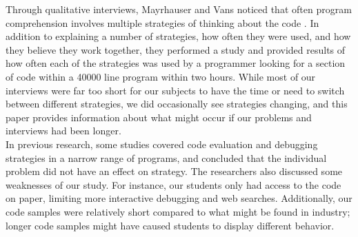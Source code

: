 Through qualitative interviews, Mayrhauser and Vans noticed that often program comprehension involves multiple strategies of thinking about the code \cite{402076}.
In addition to explaining a number of strategies, how often they were used, and how they believe they work together, they performed a study and provided results of how often each of the strategies was used by a programmer looking for a section of code within a 40000 line program within two hours.
While most of our interviews were far too short for our subjects to have the time or need to switch between different strategies, we did occasionally see strategies changing, and this paper provides information about what might occur if our problems and interviews had been longer. \\

In previous research, some studies covered code evaluation and debugging strategies in a narrow range of programs, and concluded that the individual problem did not have an effect on strategy.
The researchers also discussed some weaknesses of our study. For instance, our students only had access to the code on paper, limiting more interactive debugging and web searches.
Additionally, our code samples were relatively short compared to what might be found in industry;
 longer code samples might have caused students to display different behavior.

\newpage